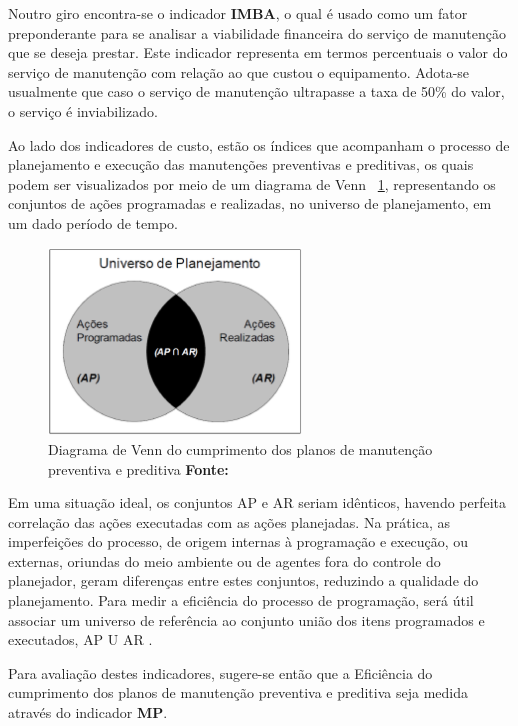 Noutro giro encontra-se o indicador \textbf{IMBA}, o qual é usado como um fator preponderante para se analisar a viabilidade financeira do serviço de manutenção que se deseja prestar. Este indicador representa em termos percentuais o valor do serviço de manutenção com relação ao que custou o equipamento. Adota-se usualmente que caso o serviço de manutenção ultrapasse a taxa de 50\% do valor, o serviço é inviabilizado.

Ao lado dos indicadores de custo, estão os índices que acompanham o processo de planejamento e execução das manutenções preventivas e preditivas, os quais podem ser visualizados por meio de um diagrama de Venn ~\ref{Diagrama de Venn da programacao}, representando os conjuntos de ações programadas e realizadas, no universo de planejamento, em um dado período de tempo. 

\graphicspath{{figuras/}}
\begin{figure}[H]
\centering
\includegraphics[width=0.6\textwidth]{Diagrama_de_Venn.eps}
\caption{Diagrama de Venn do cumprimento dos planos de manutenção preventiva e preditiva \textbf{Fonte:\cite{de2006indicadores}}}
\label{Diagrama de Venn da programacao}
\end{figure}

Em uma situação ideal, os conjuntos {AP} e {AR} seriam idênticos, havendo perfeita correlação das ações executadas com as ações planejadas. Na prática, as imperfeições do processo, de origem internas à programação e execução, ou externas, oriundas do meio ambiente ou de agentes fora do controle do planejador, geram diferenças entre estes conjuntos, reduzindo a qualidade do planejamento. Para medir a eficiência do processo de programação, será útil associar um universo de referência ao conjunto união dos itens programados e executados, {AP U AR} \cite{de2006indicadores}.

Para avaliação destes indicadores, sugere-se então que a Eficiência do cumprimento dos planos de manutenção preventiva e preditiva seja medida através do indicador \textbf{MP}.

